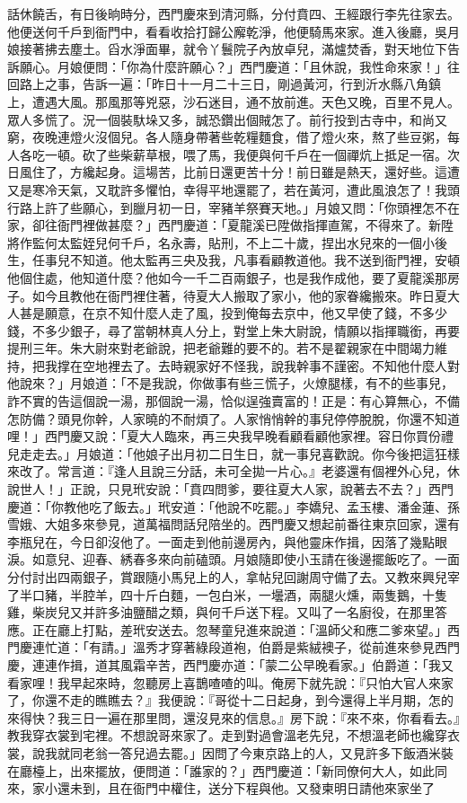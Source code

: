 \begin{showcontents}{}
話休饒舌，有日後晌時分，西門慶來到清河縣，分付賁四、王經跟行李先往家去。他便送何千戶到衙門中，看看收拾打歸公廨乾淨，他便騎馬來家。進入後廳，吳月娘接著拂去塵土。舀水淨面畢，就令丫鬟院子內放卓兒，滿爐焚香，對天地位下告訴願心。月娘便問：「你為什麼許願心？」西門慶道：「且休說，我性命來家！」往回路上之事，告訴一遍：「昨日十一月二十三日，剛過黃河，行到沂水縣八角鎮上，遭遇大風。那風那等兇惡，沙石迷目，通不放前進。天色又晚，百里不見人。眾人多慌了。況一個裝馱垛又多，誠恐鑽出個賊怎了。前行投到古寺中，和尚又窮，夜晚連燈火沒個兒。各人隨身帶著些乾糧麵食，借了燈火來，熬了些豆粥，每人各吃一頓。砍了些柴薪草根，喂了馬，我便與何千戶在一個禪炕上抵足一宿。次日風住了，方纔起身。這場苦，比前日還更苦十分！前日雖是熱天，還好些。這遭又是寒冷天氣，又耽許多懼怕，幸得平地還罷了，若在黃河，遭此風浪怎了！我頭行路上許了些願心，到臘月初一日，宰豬羊祭賽天地。」月娘又問：「你頭裡怎不在家，卻往衙門裡做甚麼？」西門慶道：「夏龍溪已陞做指揮直駕，不得來了。新陞將作監何太監姪兒何千戶，名永壽，貼刑，不上二十歲，捏出水兒來的一個小後生，任事兒不知道。他太監再三央及我，凡事看顧教道他。我不送到衙門裡，安頓他個住處，他知道什麼？他如今一千二百兩銀子，也是我作成他，要了夏龍溪那房子。如今且教他在衙門裡住著，待夏大人搬取了家小，他的家眷纔搬來。昨日夏大人甚是願意，在京不知什麼人走了風，投到俺每去京中，他又早使了錢，不多少錢，不多少銀子，尋了當朝林真人分上，對堂上朱大尉說，情願以指揮職銜，再要提刑三年。朱大尉來對老爺說，把老爺難的要不的。若不是翟親家在中間竭力維持，把我撑在空地裡去了。去時親家好不怪我，說我幹事不謹密。不知他什麼人對他說來？」月娘道：「不是我說，你做事有些三慌子，火燎腿樣，有不的些事兒，詐不實的告這個說一湯，那個說一湯，恰似逞強賣富的！正是：有心算無心，不備怎防備？頭見你幹，人家曉的不耐煩了。人家悄悄幹的事兒停停脫脫，你還不知道哩！」西門慶又說：「夏大人臨來，再三央我早晚看顧看顧他家裡。容日你買份禮兒走走去。」月娘道：「他娘子出月初二日生日，就一事兒喜歡說。你今後把這狂樣來改了。常言道：『逢人且說三分話，未可全拋一片心。』老婆還有個裡外心兒，休說世人！」正說，只見玳安說：「賁四問爹，要往夏大人家，說著去不去？」西門慶道：「你教他吃了飯去。」玳安道：「他說不吃罷。」李嬌兒、孟玉樓、潘金蓮、孫雪娥、大姐多來參見，道萬福問話兒陪坐的。西門慶又想起前番往東京回家，還有李瓶兒在，今日卻沒他了。一面走到他前邊房內，與他靈床作揖，因落了幾點眼淚。如意兒、迎春、綉春多來向前磕頭。月娘隨即使小玉請在後邊擺飯吃了。一面分付討出四兩銀子，賞跟隨小馬兒上的人，拿帖兒回謝周守備了去。又教來興兒宰了半口豬，半腔羊，四十斤白麵，一包白米，一壜酒，兩腿火燻，兩隻鵝，十隻雞，柴炭兒又并許多油鹽醋之類，與何千戶送下程。又叫了一名廚役，在那里答應。正在廳上打點，差玳安送去。忽琴童兒進來說道：「溫師父和應二爹來望。」西門慶連忙道：「有請。」溫秀才穿著綠段道袍，伯爵是紫絨襖子，從前進來參見西門慶，連連作揖，道其風霜辛苦，西門慶亦道：「蒙二公早晚看家。」伯爵道：「我又看家哩！我早起來時，忽聽房上喜鵲喳喳的叫。俺房下就先說：『只怕大官人來家了，你還不走的瞧瞧去？』我便說：『哥從十二日起身，到今還得上半月期，怎的來得快？我三日一遍在那里問，還沒見來的信息。』房下說：『來不來，你看看去。』教我穿衣裳到宅裡。不想說哥來家了。走到對過會溫老先兒，不想溫老師也纔穿衣裳，說我就同老翁一答兒過去罷。」因問了今東京路上的人，又見許多下飯酒米裝在廳檯上，出來擺放，便問道：「誰家的？」西門慶道：「新同僚何大人，如此同來，家小還未到，且在衙門中權住，送分下程與他。又發柬明日請他來家坐了
\end{showcontents}
